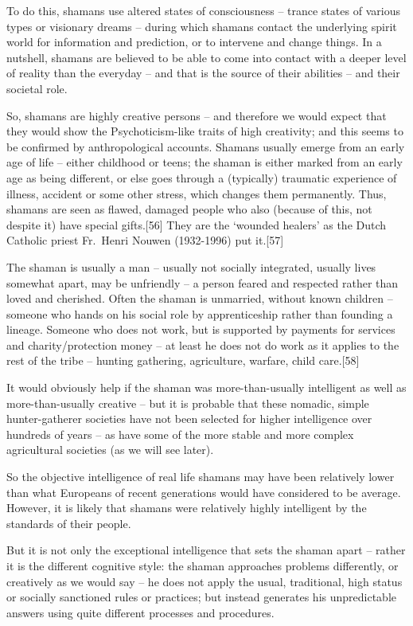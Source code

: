 \documentclass[
]{book}
\begin{document}
To do this, shamans use altered states of consciousness -- trance states of various types or visionary dreams -- during which shamans contact the underlying spirit world for information and prediction, or to intervene and change things. In a nutshell, shamans are believed to be able to come into contact with a deeper level of reality than the everyday -- and that is the source of their abilities -- and their societal role.

So, shamans are highly creative persons -- and therefore we would expect that they would show the Psychoticism-like traits of high creativity; and this seems to be confirmed by anthropological accounts. Shamans usually emerge from an early age of life -- either childhood or teens; the shaman is either marked from an early age as being different, or else goes through a (typically) traumatic experience of illness, accident or some other stress, which changes them permanently. Thus, shamans are seen as flawed, damaged people who also (because of this, not despite it) have special gifts.{[}56{]} They are the `wounded healers' as the Dutch Catholic priest Fr.~Henri Nouwen (1932-1996) put it.{[}57{]}

The shaman is usually a man -- usually not socially integrated, usually lives somewhat apart, may be unfriendly -- a person feared and respected rather than loved and cherished. Often the shaman is unmarried, without known children -- someone who hands on his social role by apprenticeship rather than founding a lineage. Someone who does not work, but is supported by payments for services and charity/protection money -- at least he does not do work as it applies to the rest of the tribe -- hunting gathering, agriculture, warfare, child care.{[}58{]}

It would obviously help if the shaman was more-than-usually intelligent as well as more-than-usually creative -- but it is probable that these nomadic, simple hunter-gatherer societies have not been selected for higher intelligence over hundreds of years -- as have some of the more stable and more complex agricultural societies (as we will see later).

So the objective intelligence of real life shamans may have been relatively lower than what Europeans of recent generations would have considered to be average. However, it is likely that shamans were relatively highly intelligent by the standards of their people.

But it is not only the exceptional intelligence that sets the shaman apart -- rather it is the different cognitive style: the shaman approaches problems differently, or creatively as we would say -- he does not apply the usual, traditional, high status or socially sanctioned rules or practices; but instead generates his unpredictable answers using quite different processes and procedures.
\end{document}

